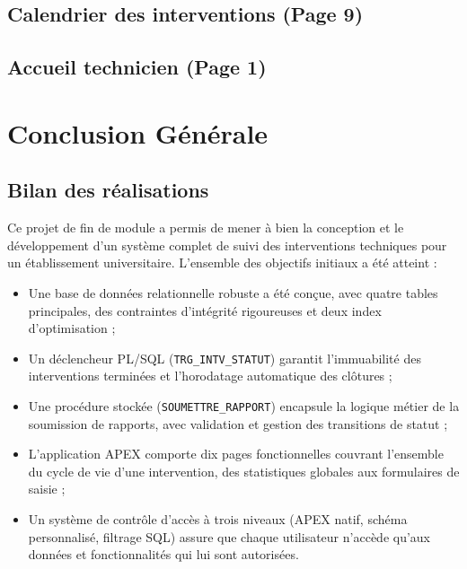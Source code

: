\documentclass[12pt,a4paper,oneside]{report}
\begin{document}

\section{Calendrier des interventions (Page 9)}


\section{Accueil technicien (Page 1)}


\chapter*{Conclusion Générale}

\section*{Bilan des réalisations}

Ce projet de fin de module a permis de mener à bien la conception et le développement d'un système complet de suivi des interventions techniques pour un établissement universitaire. L'ensemble des objectifs initiaux a été atteint :

\begin{itemize}[leftmargin=2em]
  \item Une base de données relationnelle robuste a été conçue, avec quatre tables principales, des contraintes d'intégrité rigoureuses et deux index d'optimisation ;
  \item Un déclencheur PL/SQL (\texttt{TRG\_INTV\_STATUT}) garantit l'immuabilité des interventions terminées et l'horodatage automatique des clôtures ;
  \item Une procédure stockée (\texttt{SOUMETTRE\_RAPPORT}) encapsule la logique métier de la soumission de rapports, avec validation et gestion des transitions de statut ;
  \item L'application APEX comporte dix pages fonctionnelles couvrant l'ensemble du cycle de vie d'une intervention, des statistiques globales aux formulaires de saisie ;
  \item Un système de contrôle d'accès à trois niveaux (APEX natif, schéma personnalisé, filtrage SQL) assure que chaque utilisateur n'accède qu'aux données et fonctionnalités qui lui sont autorisées.
\end{itemize}
\end{document}
